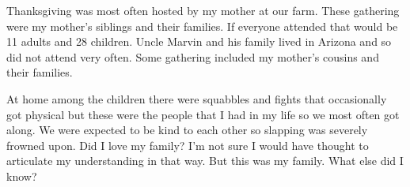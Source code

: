 Thanksgiving was most often hosted by my mother at our farm.
These gathering were my mother's siblings and their families.
If everyone attended that would be 11 adults and 28 children.
Uncle Marvin and his family lived in Arizona and so did not attend very often.
Some gathering included my mother's cousins and their families.

At home among the children there were squabbles and fights that occasionally got physical but these were the people that I had in my life so we most often got along.
We were expected to be kind to each other so slapping was severely frowned upon.
Did I love my family? I'm not sure I would have thought to articulate my understanding in that way.
But this was my family.
What else did I know?




